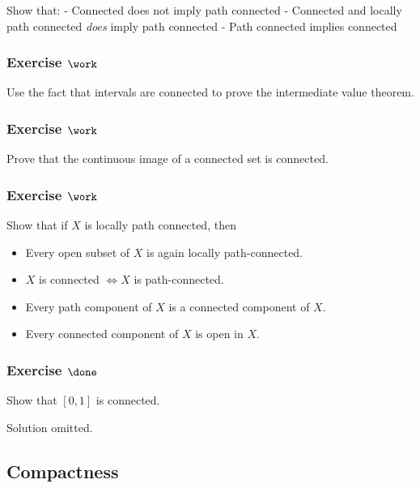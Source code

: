 Show that: - Connected does not imply path connected - Connected and
locally path connected \emph{does} imply path connected - Path connected
implies connected

\hypertarget{exercise-work-8}{%
\subsubsection{\texorpdfstring{Exercise
\(\work\)}{Exercise \textbackslash work}}\label{exercise-work-8}}

Use the fact that intervals are connected to prove the intermediate
value theorem.

\hypertarget{exercise-work-9}{%
\subsubsection{\texorpdfstring{Exercise
\(\work\)}{Exercise \textbackslash work}}\label{exercise-work-9}}

Prove that the continuous image of a connected set is connected.

\hypertarget{exercise-work-10}{%
\subsubsection{\texorpdfstring{Exercise
\(\work\)}{Exercise \textbackslash work}}\label{exercise-work-10}}

Show that if \(X\) is locally path connected, then

\begin{itemize}
\tightlist
\item
  Every open subset of \(X\) is again locally path-connected.
\item
  \(X\) is connected \(\iff X\) is path-connected.
\item
  Every path component of \(X\) is a connected component of \(X\).
\item
  Every connected component of \(X\) is open in \(X\).
\end{itemize}

\hypertarget{exercise-done-1}{%
\subsubsection{\texorpdfstring{Exercise
\(\done\)}{Exercise \textbackslash done}}\label{exercise-done-1}}

Show that \([0, 1]\) is connected.

Solution omitted.

\hypertarget{compactness}{%
\subsection{Compactness}\label{compactness}}

